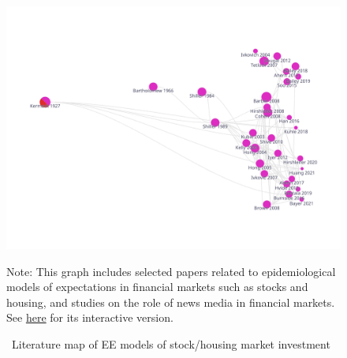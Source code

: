 \begin{figure}[!ht] \centering  %
	\caption{ ~Literature map of EE models of stock/housing market investment}
	\label{fig:graph_investment}
	\centerline{\includegraphics[width=\textwidth]{./figures/graph_investment}}
			\begin{flushleft}
	{\footnotesize Note: This graph includes selected papers related to epidemiological models of expectations in financial markets such as stocks and housing, and studies on the role of news media in financial markets. See \href{https://app.litmaps.co/shared/E25276CA-8725-437B-8241-11961EFB3FB4}{here} for its interactive version.}
					\end{flushleft}
\end{figure}

\newpage


